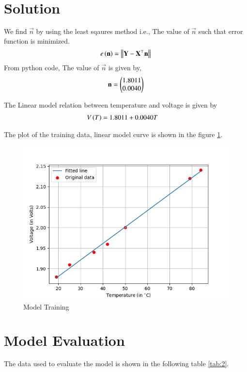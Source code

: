 \documentclass[journal,12pt,twocolumn]{IEEEtran}
\begin{document}
\section{Solution}
We find $\vec{n}$ by using the least sqaures method i.e., The value of $\vec{n}$ such that error function is minimized.
\begin{align}
e\left(\boldsymbol{\mathbf{n}}\right) = \left\lVert\boldsymbol{\mathbf{Y}} - \boldsymbol{\mathbf{X}} ^\top\boldsymbol{\mathbf{n}}\right\rVert
\end{align} 
From python code, The value of $\vec{n}$ is given by,
\begin{align}
    \boldsymbol{\mathbf{n}} = \begin{pmatrix}1.8011\\0.0040\end{pmatrix}
    \label{eq:4}
\end{align}

The Linear model relation between temperature and voltage is given by
\begin{align}
V\left(T\right) &= 1.8011 + 0.0040T
    \label{eq:5}
\end{align}

The plot of the training data, linear model curve is shown in the figure \ref{fig:2}.
\begin{figure}[h]
    \centering
    \includegraphics[width=\columnwidth]{figs/Train.png}
    \caption{Model Training}
    \label{fig:2}
\end{figure}

\newpage
\section{Model Evaluation}
The data used to evaluate the model is shown in the following table \ref{tab:2}.
\end{document}
